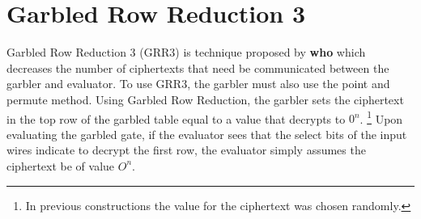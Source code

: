 
\section{Garbled Row Reduction 3}
Garbled Row Reduction 3 (GRR3) is technique proposed by \textbf{who} which decreases the number of ciphertexts that need be communicated between the garbler and evaluator.
To use GRR3, the garbler must also use the point and permute method.
Using Garbled Row Reduction, the garbler sets the ciphertext in the top row of the garbled table equal to a value that decrypts to $0^n$.
\footnote{In previous constructions the value for the ciphertext was chosen randomly.}
Upon evaluating the garbled gate, if the evaluator sees that the select bits of the input wires indicate to decrypt the first row, the evaluator simply assumes the ciphertext be of value $O^n$. 

